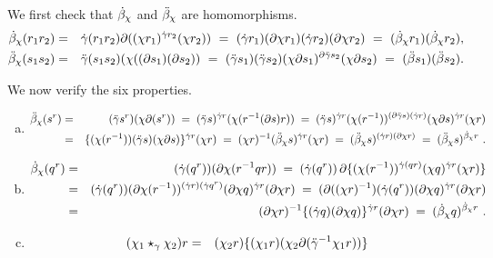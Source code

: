 \begin{pf}
We first check that $\dot{\beta}_{\chi}$ and $\ddot{\beta}_{\chi}$ are homomorphisms.
\begin{eqnarray*}
\dot{\beta}_{\chi}(r_1r_2) 
  &=&   \dot{\gamma}(r_1r_2)\partial((\chi r_1)^{\dot{\gamma} r_2}(\chi r_2)) 
    ~=~ (\dot{\gamma} r_1)(\partial\chi r_1)(\dot{\gamma} r_2)(\partial\chi r_2) 
    ~=~ (\dot{\beta}_{\chi}r_1)(\dot{\beta}_{\chi}r_2), \\
\ddot{\beta}_{\chi}(s_1s_2)
  &=&   \ddot{\gamma}(s_1s_2)(\chi((\partial s_1)(\partial s_2)) 
    ~=~ (\ddot{\gamma} s_1)(\ddot{\gamma} s_2)(\chi\partial s_1)^{\partial\ddot{\gamma} s_2}
           (\chi\partial s_2) 
    ~=~ (\ddot{\beta} s_1)(\ddot{\beta} s_2).
\end{eqnarray*}

\noindent
We now verify the six properties.
\begin{enumerate}[(a)]
\item
\mbox{}\vspace*{-9mm} 
\begin{eqnarray*} 
\ddot{\beta}_{\chi}(s^r) 
  & = &  (\ddot{\gamma} s^r)(\chi\partial(s^r)) 
    \;=\; (\ddot{\gamma} s)^{\dot{\gamma} r}(\chi(r^{-1}(\partial s)r)) 
    \;=\; (\ddot{\gamma} s)^{\dot{\gamma} r}(\chi(r^{-1}))^{(\partial\ddot{\gamma} s)(\dot{\gamma} r)}
              (\chi\partial s)^{\dot{\gamma} r}(\chi r) \\
  & = &  \{(\chi(r^{-1}))(\ddot{\gamma} s)(\chi\partial s)\}^{\dot{\gamma} r}(\chi r) 
    \;=\;  (\chi r)^{-1}(\ddot{\beta}_{\chi} s)^{\dot{\gamma} r}(\chi r) 
    \;=\;  (\ddot{\beta}_{\chi} s)^{(\dot{\gamma} r)(\partial\chi r)} 
    \;=\;  (\ddot{\beta}_{\chi} s)^{\dot{\beta}_{\chi}r}~.
\end{eqnarray*}
\item
\mbox{}\vspace*{-9mm} 
\begin{eqnarray*}
\dot{\beta}_{\chi}(q^r)
  & = &  (\dot{\gamma}(q^r))(\partial\chi(r^{-1}qr)) 
    \;=\;  (\dot{\gamma}(q^r))\,\partial\{(\chi(r^{-1}))^{\dot{\gamma}(qr)}
                (\chi q)^{\dot{\gamma} r}(\chi r)\} \\
  & = &  (\dot{\gamma}(q^r))(\partial\chi(r^{-1}))^{(\dot{\gamma} r)(\dot{\gamma} q^r)} 
                (\partial\chi q)^{\dot{\gamma} r}(\partial\chi r) 
    \;=\;  (\partial((\chi r)^{-1})(\dot{\gamma}(q^r))
                (\partial\chi q)^{\dot{\gamma} r}(\partial\chi r) \\
  & = &  (\partial\chi r)^{-1}\{(\dot{\gamma} q)(\partial\chi q)\}^{\dot{\gamma} r} 
                (\partial\chi r) 
    \;=\;  (\dot{\beta}_{\chi}q)^{\dot{\beta}_{\chi}r}~.
\end{eqnarray*}
\item 
\mbox{}\vspace*{-9mm} 
\begin{eqnarray*} 
(\chi_1\star_{\gamma}\chi_2)r 
  & = &
    (\chi_2 r)\{(\chi_1 r)(\chi_2\partial(\ddg^{-1}\chi_1 r))\}

\end{eqnarray*}
\end{enumerate}
\end{pf}
